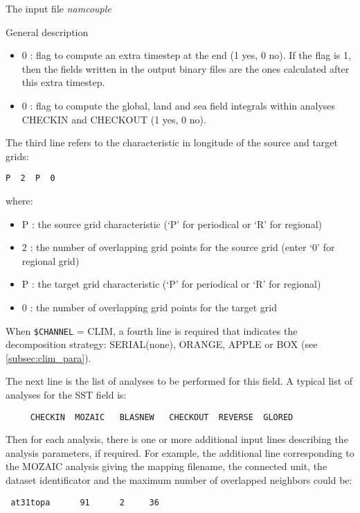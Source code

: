 \begin{subsection}{The input file {\it namcouple}}
\begin{subsubsection}{General description}
\begin{itemize}
            the ocean model. OASIS is written so that the ocean model
            re-uses the initial atmospheric flux fields for that
            second coupling timestep.
      \item 0 : flag to compute an extra timestep at the end (1 yes, 0
            no). If the flag is 1, then the fields written in the
            output binary files are the ones calculated after this
            extra timestep.
      \item 0 : flag to compute the global, land and sea field integrals 
            within analyses CHECKIN and CHECKOUT (1 yes, 0 no).
    \end{itemize}

\vspace{0.4cm}

The third line refers to the characteristic in longitude of the source
and target grids:

\begin{verbatim}
P  2  P  0
\end{verbatim}
where:
    \begin{itemize}
      \item P : the source grid characteristic (`P' for periodical 
            or `R' for regional)
      \item 2 : the number of overlapping grid points for the source
            grid (enter `0' for regional grid)
      \item P : the target grid characteristic (`P' for periodical 
            or `R' for regional)
      \item 0 : the number of overlapping grid points for the target
            grid 
    \end{itemize}    

\vspace{0.4cm}

When {\tt \$CHANNEL} = CLIM, a fourth line is required that indicates 
the decomposition strategy: SERIAL(none), ORANGE, APPLE or BOX (see 
\ref{subsec:clim_para}).

\vspace{0.4cm}

The next line is the list of analyses to be performed for
this field.
A typical list of analyses for the SST field is:
\begin{verbatim}
     CHECKIN  MOZAIC   BLASNEW   CHECKOUT  REVERSE  GLORED
\end{verbatim}

Then for each analysis, there is one or more additional input 
lines describing the analysis parameters, if required.
For example, the additional line corresponding to the MOZAIC analysis
giving the mapping filename, the connected unit, the dataset
identificator and
the maximum number of overlapped neighbors could be:
\begin{verbatim}             
 at31topa      91      2     36 
\end{verbatim}


\end{subsubsection}
\end{subsection}
